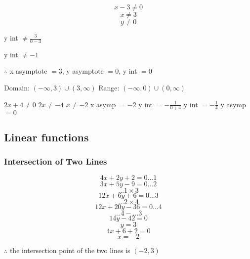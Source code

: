 \documentclass{report}
\begin{document}
$$x-3 \neq 0$$
$$x \neq 3$$
$$y \neq 0$$
\begin{center} y int $\neq\frac{3}{0-3}$\end{center}
\begin{center} y int $\neq-1$\end{center}
\begin{center}
    $\therefore$ x asymptote $= 3$, y asymptote $= 0$, y int $= 0$
\end{center}
\begin{center}   
    Domain:
    \newline
    $(-\infty, 3)\cup(3,\infty) $
    \newline
    Range:
    \newline
    $(-\infty,0)\cup(0,\infty)$
\end{center}
\newpage
{}
\begin{center}
    $2x+4 \neq 0$
    \newline
    $2x \neq -4$
    \newline
    $x \neq -2$
    \newline
    x asymp $= -2$
    \newline
    y int $= -\frac{1}{0+4}$
    \newline
    y int $= -\frac{1}{4}$
    \newline
    y asymp $= 0$

\end{center}


\subsection{Linear functions}
\subsubsection{Intersection of Two Lines}
$$4x+2y+2=0...1$$
$$3x+5y-9=0...2$$
$$...1 \times 3$$
$$12x+6y+6 = 0...3$$
$$...2 \times 4$$
$$12x+20y-36=0...4$$
$$...4 - ...3$$
$$14y - 42 = 0$$
$$y = 3$$
$$4x+6+2 = 0$$
$$x = -2$$
\begin{center}
    $\therefore$ the intersection point of the two lines is $(-2,3)$
\end{center}
\end{document}
